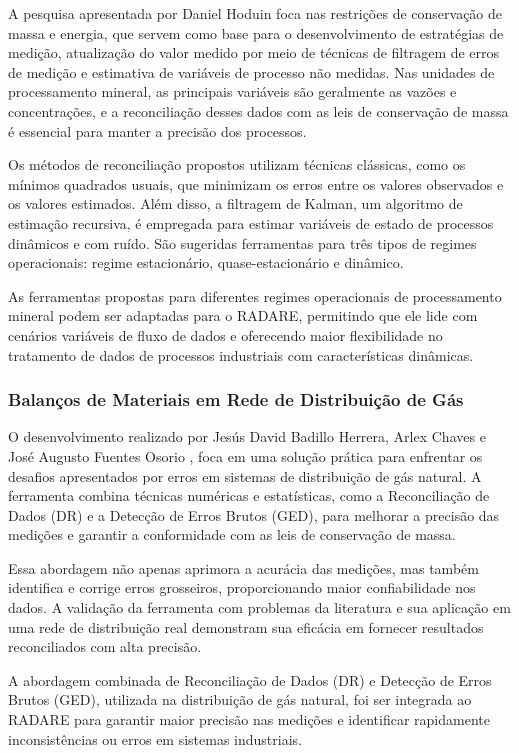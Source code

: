 A pesquisa apresentada por Daniel Hoduin \cite{danielhoduin} foca nas restrições de conservação de massa e energia, que servem como base para o desenvolvimento de estratégias de medição, atualização do valor medido por meio de técnicas de filtragem de erros de medição e estimativa de variáveis de processo não medidas. Nas unidades de processamento mineral, as principais variáveis são geralmente as vazões e concentrações, e a reconciliação desses dados com as leis de conservação de massa é essencial para manter a precisão dos processos.

Os métodos de reconciliação propostos utilizam técnicas clássicas, como os mínimos quadrados usuais, que minimizam os erros entre os valores observados e os valores estimados. Além disso, a filtragem de Kalman, um algoritmo de estimação recursiva, é empregada para estimar variáveis de estado de processos dinâmicos e com ruído. São sugeridas ferramentas para três tipos de regimes operacionais: regime estacionário, quase-estacionário e dinâmico.

As ferramentas propostas para diferentes regimes operacionais de processamento mineral podem ser adaptadas para o RADARE, permitindo que ele lide com cenários variáveis de fluxo de dados e oferecendo maior flexibilidade no tratamento de dados de processos industriais com características dinâmicas.

\subsubsection{Balanços de Materiais em Rede de Distribuição de Gás}

O desenvolvimento realizado por Jesús David Badillo Herrera, Arlex Chaves e José Augusto Fuentes Osorio \cite{balancecontrol}, foca em uma solução prática para enfrentar os desafios apresentados por erros em sistemas de distribuição de gás natural. A ferramenta combina técnicas numéricas e estatísticas, como a Reconciliação de Dados (DR) e a Detecção de Erros Brutos (GED), para melhorar a precisão das medições e garantir a conformidade com as leis de conservação de massa.

Essa abordagem não apenas aprimora a acurácia das medições, mas também identifica e corrige erros grosseiros, proporcionando maior confiabilidade nos dados. A validação da ferramenta com problemas da literatura e sua aplicação em uma rede de distribuição real demonstram sua eficácia em fornecer resultados reconciliados com alta precisão.

A abordagem combinada de Reconciliação de Dados (DR) e Detecção de Erros Brutos (GED), utilizada na distribuição de gás natural, foi ser integrada ao RADARE para garantir maior precisão nas medições e identificar rapidamente inconsistências ou erros em sistemas industriais.

